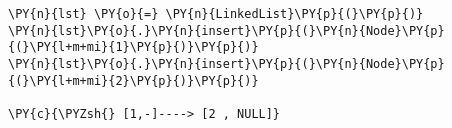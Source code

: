 \begin{Verbatim}[commandchars=\\\{\}]
\PY{n}{lst} \PY{o}{=} \PY{n}{LinkedList}\PY{p}{(}\PY{p}{)}
\PY{n}{lst}\PY{o}{.}\PY{n}{insert}\PY{p}{(}\PY{n}{Node}\PY{p}{(}\PY{l+m+mi}{1}\PY{p}{)}\PY{p}{)}
\PY{n}{lst}\PY{o}{.}\PY{n}{insert}\PY{p}{(}\PY{n}{Node}\PY{p}{(}\PY{l+m+mi}{2}\PY{p}{)}\PY{p}{)}

\PY{c}{\PYZsh{} [1,-]----> [2 , NULL]}
\end{Verbatim}
